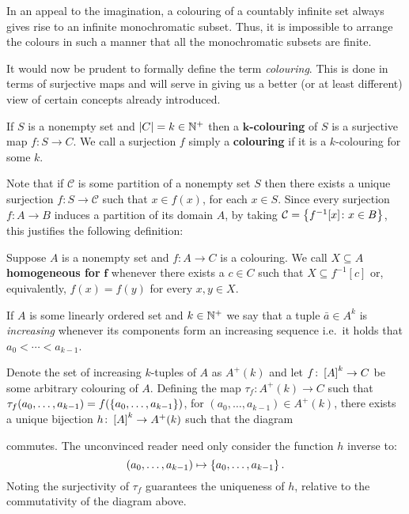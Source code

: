 In an appeal to the imagination, a colouring of a countably infinite set always
gives rise to an infinite monochromatic subset.  Thus, it is impossible to
arrange the colours in such a manner that all the monochromatic subsets are
finite.

It would now be prudent to formally define the term \textit{colouring}.  This is
done in terms of surjective maps and will serve in giving us a better (or at
least different) view of certain concepts already introduced.

\begin{dfn}[Colouring]\label{def:Col}
	If $S$ is a nonempty set and $\card{C}=k\in\posnats$ then a
	$\mathbf{k}$\textbf{-colouring} of $S$ is a surjective map $f\colon  S\to
	C$.  We call a surjection $f$ simply a \textbf{colouring} if it is a
	$k$-colouring for some $k$.
\end{dfn}

Note that if $\mathcal{C}$ is some partition of a nonempty set $S$ then there
exists a unique surjection $f\colon S\to \mathcal{C}$ such that $x\in f(x)$, for
each $x\in S$. Since every surjection $f\colon A\to B$ induces a partition of
its domain $A$, by taking $\mathcal{C}=\setbuild{f^{-1}[x]}{x\in B}$, this
justifies the following definition:

\begin{dfn}
	Suppose $A$ is a nonempty set and $f\colon A\to C$ is a colouring.  We call
	$X\subseteq A$ \textbf{homogeneous for} $\bm{f}$ whenever there exists a $c\in
	C$ such that $X\subseteq f^{-1}[c]$ or, equivalently, $f(x)=f(y)$ for every
	$x,y\in X$.
\end{dfn}

If $A$ is some linearly ordered set and $k\in\posnats$ we say that a tuple
$\bar{a}\in A^k$ is \textit{increasing} whenever its components form an
increasing sequence i.e.\ it holds that $a_0<\dotsb<a_{k-1}$.

Denote the set of increasing $k$-tuples of $A$ as $A^+(k)$ and let $f\colon
\subsets{k}{A}\to C$ be some arbitrary colouring of $A$.  Defining the map
$\tau_f\colon A^+(k)\to C$ such that
$\tau_f(a_0,\dotsc,a_{k-1})=f(\set{a_0,\dotsc,a_{k-1}})$, for
$(a_0,\dotsc,a_{k-1})\in A^+(k)$, there exists a unique bijection $h\colon
\subsets{k}{A}\to A^+(k)$ such that the diagram
\begin{center}
\end{center}
commutes.  The unconvinced reader need only consider the function $h$ inverse
to:
\begin{equation}
	(a_0,\dotsc,a_{k-1})\mapsto\set{a_0,\dotsc,a_{k-1}}.
\end{equation}
Noting the surjectivity of $\tau_f$ guarantees the uniqueness of $h$,
relative to the commutativity of the diagram above.


